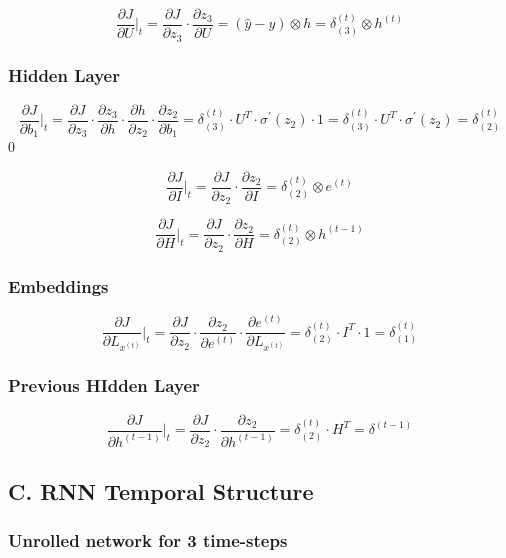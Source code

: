 \documentclass{article}
\begin{document}
$$
	\frac {\partial J}{\partial U} \Big|_t = \frac {\partial J}{\partial z_3} \cdot \frac {\partial z_3}{\partial U} = (\hat y - y) \otimes h = \delta_{(3)}^{(t)} \otimes h^{(t)}
$$

\subsubsection*{Hidden Layer}
$$
	\frac {\partial J}{\partial b_1} \Big|_t= \frac {\partial J}{\partial z_3} \cdot \frac {\partial z_3}{\partial h} \cdot \frac {\partial h}{\partial z_2} \cdot \frac {\partial z_2}{\partial b_1} = \delta_{(3)}^{(t)} \cdot U^{T} \cdot \sigma^{'}(z_2) \cdot 1= \delta_{(3)}^{(t)} \cdot U^{T} \cdot \sigma^{'}(z_2) = \delta_{(2)}^{(t)}
$$0

$$
	\frac {\partial J}{\partial I}\Big|_t = \frac {\partial J}{\partial z_2} \cdot \frac {\partial z_2}{\partial I} = \delta_{(2)}^{(t)} \otimes {e^{(t)}}
$$

$$
	\frac {\partial J}{\partial H}\Big|_t = \frac {\partial J}{\partial z_2} \cdot \frac {\partial z_2}{\partial H} = \delta_{(2)}^{(t)} \otimes {h^{(t-1)}}
$$

\subsubsection*{Embeddings}
$$
	\frac {\partial J}{\partial L_{x^{(t)}}}\Big|_t = \frac {\partial J}{\partial z_2} \cdot \frac{\partial z_2}{\partial e^{(t)}}\cdot \frac {\partial e^{(t)}}{\partial  L_{x^{(t)}}} = \delta_{(2)}^{(t)} \cdot I^{T} \cdot 1 = \delta_{(1)}^{(t)}
$$

\subsubsection*{Previous HIdden Layer}
$$
	\frac {\partial J}{\partial h^{(t-1)}}\Big|_t = \frac {\partial J}{\partial z_2} \cdot \frac {\partial z_2}{\partial h^{(t-1)}} = \delta_{(2)}^{(t)} \cdot H^{T} = \delta^{(t-1)}
$$

\subsection*{C. RNN Temporal Structure}
\subsubsection*{Unrolled network for 3 time-steps}
\end{document}
